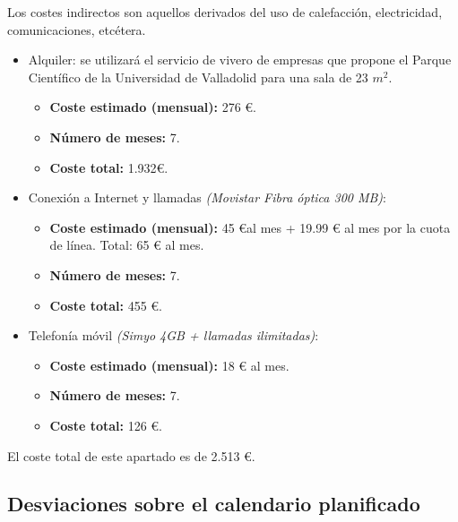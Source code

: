 \documentclass[twoside]{report}
\begin{document}
Los costes indirectos son aquellos derivados del uso de calefacción, electricidad, comunicaciones, etcétera.

\begin{itemize}

\item Alquiler: se utilizará el servicio de vivero de empresas que propone el \cite{pcuva} Parque Científico de la Universidad de Valladolid para una sala de 23 ${m}^{2}$.
	\begin{itemize}
		\item \textbf{Coste estimado (mensual): } 276 \euro.
		\item \textbf{Número de meses:} 7.
		\item \textbf{Coste total:} 1.932\euro.
	\end{itemize}
	
\item Conexión a Internet y llamadas \textit{(Movistar Fibra óptica 300 MB)}:
	\begin{itemize}
		\item \textbf{Coste estimado (mensual):} 45 \euro \hspace{0.1cm}al mes + 19.99 \euro \hspace{0.1cm} al mes por la cuota de línea. Total: 65 \euro \hspace{0.1cm} al mes.
		\item \textbf{Número de meses:} 7.
		\item \textbf{Coste total:} 455 \euro.
	\end{itemize}
		
\item Telefonía móvil \textit{(Simyo 4GB + llamadas ilimitadas)}:
	\begin{itemize}
		\item \textbf{Coste estimado (mensual):} 18 \euro \hspace{0.1cm} al mes.
		\item \textbf{Número de meses:} 7.
		\item \textbf{Coste total:} 126 \euro.
	\end{itemize}

\end{itemize}

El coste total de este apartado es de 2.513 \euro.

\subsection{Desviaciones sobre el calendario planificado}
\end{document}
